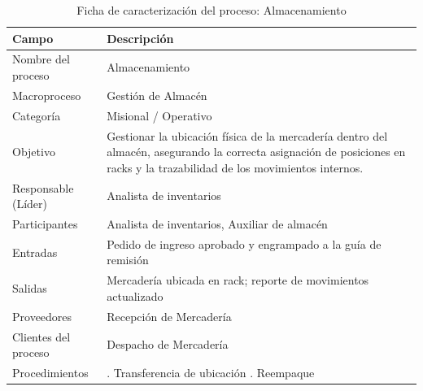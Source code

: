 \documentclass[11pt, a4paper, oneside]{report}
\begin{document}
\begin{table}[H]
\centering\small
\renewcommand{\arraystretch}{1.35}
\setlength{\tabcolsep}{6pt}
\begin{tabularx}{\textwidth}{|>{\raggedright\arraybackslash}p{}|>{\raggedright\arraybackslash}X|}
\hline
\rowcolor{upeu_dark}
\color{white}\bfseries Campo & \color{white}\bfseries Descripción \\ \hline
\rowcolor{gray!10}
Nombre del proceso & Almacenamiento \\ \hline
Macroproceso & Gestión de Almacén \\ \hline
\rowcolor{gray!10}
Categoría & Misional / Operativo \\ \hline
Objetivo & Gestionar la ubicación física de la mercadería dentro del almacén, asegurando la correcta asignación de posiciones en racks y la trazabilidad de los movimientos internos. \\ \hline
\rowcolor{gray!10}
Responsable (Líder) & Analista de inventarios \\ \hline
Participantes & Analista de inventarios, Auxiliar de almacén \\ \hline
\rowcolor{gray!10}
Entradas & Pedido de ingreso aprobado y engrampado a la guía de remisión \\ \hline
Salidas & Mercadería ubicada en rack; reporte de movimientos actualizado \\ \hline
\rowcolor{gray!10}
Proveedores & Recepción de Mercadería \\ \hline
Clientes del proceso & Despacho de Mercadería \\ \hline
\rowcolor{gray!10}
Procedimientos & 1. Transferencia de ubicación \newline 2. Reempaque \\ \hline
\end{tabularx}
\caption{Ficha de caracterización del proceso: Almacenamiento}
\end{table}
\end{document}
